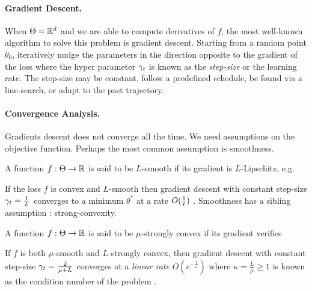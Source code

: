 \paragraph{Gradient Descent.}
When $\Theta = \mathbb{R}^d$ and we are able to compute  derivatives of $f$, the most well-known algorithm to solve this problem is gradient descent. 
Starting from a random point $\theta_0$, iteratively nudge the parameters in the direction opposite to the gradient of the loss
where the hyper parameter $\gamma_t$ is known as the \emph{step-size} or the learning rate. 
The step-size may be constant, follow a predefined schedule, be found via a line-search, or adapt to the past trajectory.

\paragraph{Convergence Analysis.}
Gradients descent does not converge all the time. 
We need assumptions on the objective function.
Perhaps the most common assumption is smoothness.
\begin{definition}[smoothness]
	A function $f:\Theta \rightarrow\mathbb{R}$ is said to be $L$-smooth if its gradient is $L$-Lipschitz, e.g.
\end{definition}
If the loss  $f$ is convex and $L$-smooth then gradient descent with constant step-size $\gamma_t = \frac{1}{L}$ converges to a minimum $\theta^*$ at a rate $O(\frac{1}{t})$ \citep[corollary 2.1.2]{nesterov2004Intro}. 
Smoothness has a sibling assumption : strong-convexity.
\begin{definition}
	A function $f:\Theta \rightarrow\mathbb{R}$ is said to be $\mu$-strongly convex if its gradient verifies
\end{definition}
If $f$ is both $\mu$-smooth and $L$-strongly convex, then gradient descent with constant step-size $\gamma_t = \frac{2}{\mu + L}$ converges at a \emph{linear rate} $O(e^{-\frac{t}{\kappa}})$ where $\kappa= \frac{L}{\mu} \geq 1$ is known as the condition number of the problem \citep[theorem 2.1.15]{nesterov2004Intro}.

